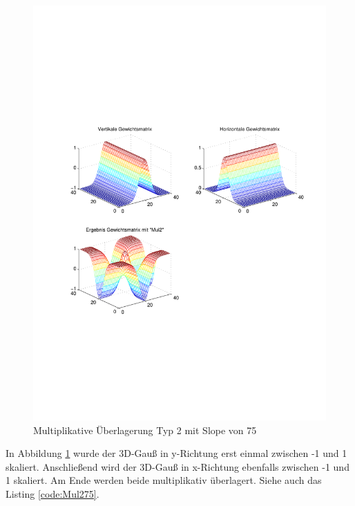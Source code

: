 \newpage
\begin{figure}[hbt]
	\centering
	\includegraphics[trim=70 211 42 242, clip, width=\linewidth]{./Bilder/Auswertung/GewichtmatrixEinzelschritte/Endergebnis_Gewichtsmatrix_Slope_75_Type_Mul2}
	\caption{Multiplikative Überlagerung Typ 2 mit Slope von 75}
	\label{Mul275}
\end{figure}

In Abbildung \ref{Mul275} wurde der 3D-Gauß in y-Richtung erst einmal zwischen -1 und 1 skaliert. Anschließend wird der 3D-Gauß in x-Richtung ebenfalls zwischen -1 und 1 skaliert. Am Ende werden beide multiplikativ überlagert. Siehe auch das Listing \ref{code:Mul275}.



